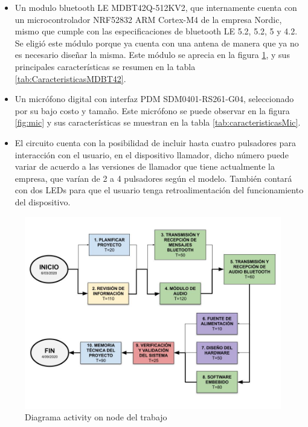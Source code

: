 \begin{itemize}

\item Un modulo bluetooth LE MDBT42Q-512KV2, que internamente cuenta con un microcontrolador NRF52832 ARM Cortex-M4 de la empresa Nordic, mismo que cumple con las especificaciones de bluetooth LE 5.2, 5.2, 5 y 4.2. Se eligió este módulo porque ya cuenta con una antena de manera que ya no es necesario diseñar la misma. Este módulo se aprecia en la figura \ref{fig:MDBT42}, y sus principales características se resumen en la tabla \ref{tab:CaracteristicasMDBT42}.

\item Un micrófono digital con interfaz PDM SDM0401-RS261-G04, seleccionado por su bajo costo y tamaño. Este micrófono se puede observar en la figura \ref{fig:mic} y sus características se muestran en la tabla \ref{tab:caracteristicasMic}.

\item El circuito cuenta con la posibilidad de incluir hasta cuatro pulsadores para interacción con el usuario, en el dispositivo llamador, dicho número puede variar de acuerdo a las versiones de llamador que tiene actualmente la empresa, que varían de 2 a 4 pulsadores según el modelo. También contará con dos LEDs para que el usuario tenga retroalimentación del funcionamiento del dispositivo.

\end{itemize}

\begin{figure}[htpb]
	\centering
	\includegraphics[scale=0.4]{./Figures/ActivityOnNode.jpg}
	\caption{Diagrama activity on node del trabajo}
	\label{fig:MDBT42}
\end{figure}

